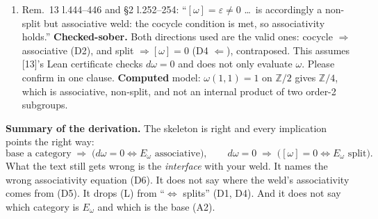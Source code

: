 \documentclass[11pt]{article}
\newcommand{\Z}{\mathbb{Z}}
\begin{document}
\begin{enumerate}[label=\textbf{D\arabic*},leftmargin=*]
is non-associative (\textbf{computed}). (A1a.)
\item Rem.~13 l.444--446 and \S2 l.252--254: ``$[\omega]=\varepsilon\neq0$ \dots\ is accordingly a
non-split but associative weld: the cocycle condition is met, so associativity holds.''
\textbf{Checked-sober.} Both directions used are the valid ones: cocycle $\Rightarrow$ associative
(D2), and split $\Rightarrow[\omega]=0$ (D4 $\Leftarrow$), contraposed. This assumes [13]'s Lean
certificate checks $d\omega=0$ and does not only evaluate $\omega$. Please confirm in one clause.
\textbf{Computed} model: $\omega(1,1)=1$ on $\Z/2$ gives $\Z/4$, which is associative, non-split, and
not an internal product of two order-2 subgroups.
\end{enumerate}

\textbf{Summary of the derivation.} The skeleton is right and every implication points the right way:
\[\text{base a category}\;\Rightarrow\;\bigl(d\omega=0\iff E_\omega\text{ associative}\bigr),\qquad
d\omega=0\;\Rightarrow\;\bigl([\omega]=0\iff E_\omega\text{ split}\bigr).\]
What the text still gets wrong is the \emph{interface} with your weld. It names the wrong
associativity equation (D6). It does not say where the weld's associativity comes from (D5). It
drops (L) from ``$\iff$ splits'' (D1, D4). And it does not say which category is $E_\omega$ and which
is the base (A2).
\end{document}
